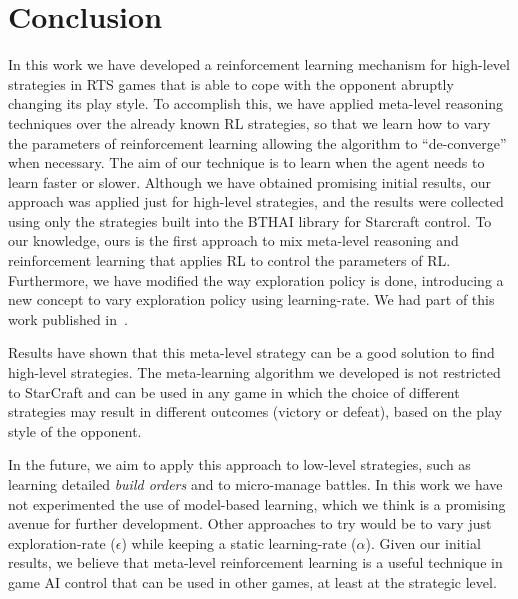 \chapter{Conclusion}
\label{chapter:conclusion}

In this work we have developed a reinforcement learning mechanism for high-level strategies in RTS games that is able to cope with the opponent abruptly changing its play style.
To accomplish this, we have applied meta-level reasoning techniques over the already known RL strategies, so that we learn how to vary the parameters of reinforcement learning allowing the algorithm to ``de-converge'' when necessary.
The aim of our technique is to learn when the agent needs to learn faster or slower. 
Although we have obtained promising initial results, our approach was applied just for high-level strategies, and the results were collected using only the strategies built into the BTHAI library for Starcraft control.
To our knowledge, ours is the first approach to mix meta-level reasoning and reinforcement learning that applies RL to control the parameters of RL.
Furthermore, we have modified the way exploration policy is done, introducing a new concept to vary exploration policy using learning-rate.
We had part of this work published in~\cite{mypaper}.

Results have shown that this meta-level strategy can be a good solution to find high-level strategies.
The meta-learning algorithm we developed is not restricted to StarCraft and can be used in any game in which the choice of different strategies may result in different outcomes (victory or defeat), based on the play style of the opponent. 

In the future, we aim to apply this approach to low-level strategies, such as learning detailed \textit{build orders} and to micro-manage battles.
In this work we have not experimented the use of model-based learning, which we think is a promising avenue for further development.
Other approaches to try would be to vary just exploration-rate ($\epsilon$) while keeping a static learning-rate ($\alpha$).
Given our initial results, we believe that meta-level reinforcement learning is a useful technique in game AI control that can be used in other games, at least at the strategic level.